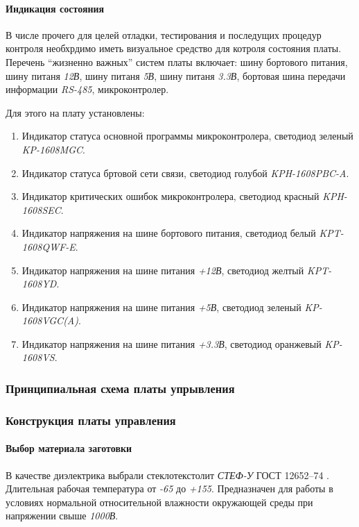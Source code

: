 \paragraph{Индикация состояния}
В числе прочего для целей отладки, тестирования и последущих процедур контроля
необхрдимо иметь визуальное средство для котроля состояния платы.
Перечень ``жизненно важных'' систем платы включает:
шину бортового питания,
шину питаня \textit{12В},
шину питаня \textit{5В},
шину питаня \textit{3.3В},
бортовая шина передачи информации \textit{RS-485},
микроконтролер.

Для этого на плату установлены:
\begin{enumerate}
    \item Индикатор статуса основной программы микроконтролера,
            светодиод зеленый \textit{KP-1608MGC}.
    \item Индикатор статуса бртовой сети связи,
            светодиод голубой \textit{KPH-1608PBC-A}.
    \item Индикатор критических ошибок микроконтролера,
            светодиод красный \textit{KPH-1608SEC}.
    \item Индикатор напряжения на шине бортового питания,
            светодиод белый \textit{KPT-1608QWF-E}.
    \item Индикатор напряжения на шине питания \textit{+12В},
            светодиод желтый \textit{KPT-1608YD}.
    \item Индикатор напряжения на шине питания \textit{+5В},
            светодиод зеленый \textit{KP-1608VGC(A)}.
    \item Индикатор напряжения на шине питания \textit{+3.3В},
            светодиод оранжевый \textit{KP-1608VS}.
\end{enumerate}

\subsubsection{Принципиальная схема платы упрывления}
\subsubsection{Конструкция платы управления}
\paragraph{Выбор материала заготовки}
В качестве диэлектрика выбрали стеклотекстолит
\textit{СТЕФ-У} ГОСТ 12652--74 \cite{GOST_12652_74}.
Длительная рабочая температура от \textit{-65\textcelsius}
до \textit{+155\textcelsius}.
Предназначен для работы в условиях нормальной относительной влажности
окружающей среды при напряжении свыше \textit{1000В}.

